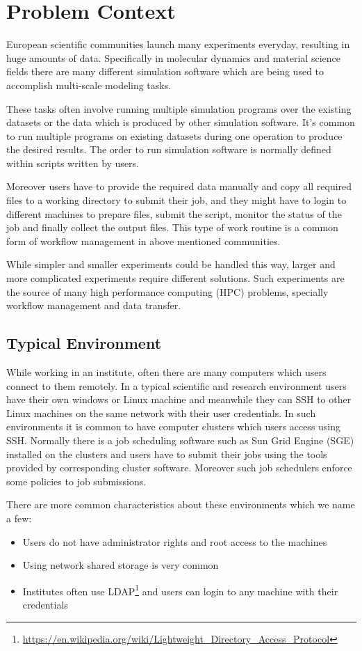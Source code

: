 \section{Problem Context}
European scientific communities launch many experiments everyday, resulting in huge amounts
of data. Specifically in molecular dynamics and material science fields there are many different
simulation software which are being used to accomplish multi-scale modeling tasks. 

These tasks often involve running multiple simulation programs over the existing datasets or the data which is
produced by other simulation software. It's common to run multiple programs on existing datasets
during one operation to produce the desired results. The order to run simulation software is normally 
defined within scripts written by users. 

Moreover users have to provide the required data manually and copy all required files to a working
directory to submit their job, and they might have to login to different machines to prepare files,
submit the script, monitor the status of the job and finally collect the output files. 
This type of work routine is a common form of workflow management in above mentioned communities.

While simpler and smaller experiments could be handled this way, larger and more complicated experiments
require different solutions. 
Such experiments are the source of many high performance computing (HPC) problems, specially workflow management and data transfer.

\subsection{Typical Environment}
While working in an institute, often there are many computers which users connect to them remotely. In a typical
scientific and research environment users have their own windows or Linux machine and meanwhile they can SSH to other
Linux machines on the same network with their user credentials. In such environments it is common to have computer clusters
which users access using SSH. Normally there is a job scheduling software such as Sun Grid Engine (SGE) installed on the clusters
and users have to submit their jobs using the tools provided by corresponding cluster software.
Moreover such job schedulers enforce some policies to job submissions.

There are more common characteristics about these environments which we name a few:
\begin{itemize}
\item Users do not have administrator rights and root access to the machines
\item Using network shared storage is very common
\item Institutes often use LDAP\footnote{\url{https://en.wikipedia.org/wiki/Lightweight_Directory_Access_Protocol}} 
and users can login to any machine with their credentials
\end{itemize}

